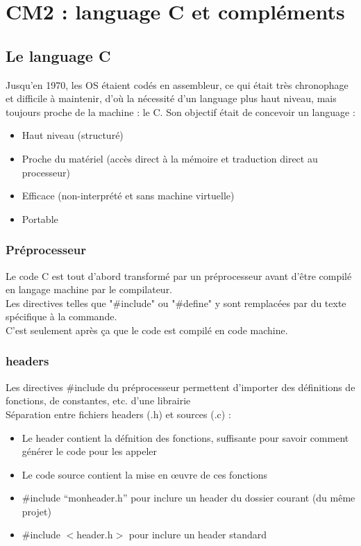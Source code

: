 \documentclass{article}
\begin{document}
\section{CM2 : language C et compléments}
    \subsection{Le language C}
        Jusqu'en 1970, les OS étaient codés en assembleur, ce qui était 
        très chronophage et difficile à maintenir, d'où la nécessité d'un 
        language plus haut niveau, mais toujours proche de la machine : le C.
        Son objectif était de concevoir un language :
        \begin{itemize}
            \item Haut niveau (structuré)
            \item Proche du matériel (accès direct à la mémoire et traduction direct au processeur)
            \item Efficace (non-interprété et sans machine virtuelle)
            \item Portable
        \end{itemize}
        
        \subsubsection{Préprocesseur}
            Le code C est tout d’abord transformé par un
            préprocesseur avant d’être compilé en
            langage machine par le compilateur.\\
            Les directives telles que "\#include" ou "\#define" y sont remplacées
            par du texte spécifique à la commande.\\
            C'est seulement après ça que le code est compilé en code machine.

        \subsubsection{headers}
            Les directives \#include du préprocesseur permettent d’importer
            des définitions de fonctions, de constantes, etc. d’une librairie \\
            Séparation entre fichiers headers (.h) et sources (.c) :
            \begin{itemize}
                \item Le header contient la défnition des fonctions, suffisante pour savoir
                comment générer le code pour les appeler
                \item Le code source contient la mise en œuvre de ces fonctions
                \item \#include “monheader.h” pour inclure un header du dossier
                courant (du même projet)
                \item \#include $<$header.h$>$ pour inclure un header standard
            \end{itemize}
        
\end{document}

